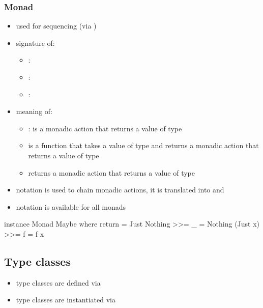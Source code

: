 \documentclass[a4paper,landscape,10pt]{article}
\begin{document}
\begin{multicols*}{2}
  \subsubsection{Monad}

  \begin{itemize}
    \item used for sequencing (via \ihaskell{>>=})
    \item signature of:
          \begin{itemize}
            \item \ihaskell{>>=}: 
            \item \ihaskell{>>}: 
            \item {}: 
          \end{itemize}
    \item meaning of:
          \begin{itemize}
            \item \ihaskell{>>=}:  is a monadic action that returns a value of type 
            \item {} is a function that takes a value of type  and returns a monadic action that returns a value of type 
            \item \ihaskell{>>=} returns a monadic action that returns a value of type 
          \end{itemize}
    \item {} notation is used to chain monadic actions, it is translated into \ihaskell{>>=} and \ihaskell{>>}
    \item {} notation is available for all monads
  \end{itemize}

  \begin{haskell}
instance Monad Maybe where
  return = Just
  Nothing >>= _ = Nothing
  (Just x) >>= f = f x
\end{haskell}

  \breakcolumn

  \subsection{Type classes}

  \begin{itemize}
    \item type classes are defined via 
    \item type classes are instantiated via 
  \end{itemize}


\end{multicols*}
\end{document}
